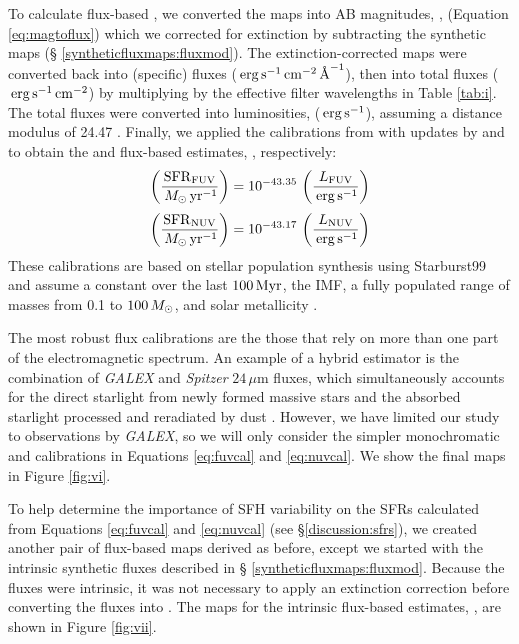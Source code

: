 \documentclass[iop, tighten]{emulateapj}
\begin{document}
To calculate flux-based , we converted the \fxobs{} maps into AB
magnitudes, \xobs{}, (Equation \ref{eq:magtoflux}) which we corrected for
extinction by subtracting the synthetic \ax{} maps (\S
\ref{syntheticfluxmaps:fluxmod}). The extinction-corrected maps were converted
back into (specific) fluxes ($\!\, \,\mathrm{erg}\,\mathrm{s}^{-1}\,\mathrm{cm}^{-2}\,\textrm{\AA}^{-1}$), then into total fluxes ($\,\mathrm{erg}
\,\mathrm{s}^{-1} \,\mathrm{cm}^{-2}$) by multiplying by the effective filter wavelengths in
Table \ref{tab:i}. The total fluxes were converted into luminosities, \lx{}
($\,\mathrm{erg} \,\mathrm{s}^{-1}$), assuming a distance modulus of 24.47
\citep{McConnachie:2005}. Finally, we applied the calibrations from
\citet{Kennicutt:1998} with updates by \citet{Hao:2011} and \citet{Murphy:2011}
\citep[see the review by][]{Kennicutt:2012} to obtain the \fuv{} and \nuv{}
flux-based \sfr{} estimates, \sfrx{}, respectively:
%
\begin{equation} \left(\frac{\sfrfuv}{\msun\yr^{-1}}\right) =
10^{-43.35}\,\left(\frac{\lfuv}{\erg\ssec^{-1}}\right) \label{eq:fuvcal}
\end{equation}
%
\begin{equation} \left(\frac{\sfrnuv}{\msun\yr^{-1}}\right) =
10^{-43.17}\,\left(\frac{\lnuv}{\erg\ssec^{-1}}\right) \label{eq:nuvcal}
\end{equation}
%
These calibrations are based on stellar population synthesis using Starburst99
\citep{Leitherer:1999} and assume a constant \sfr{} over the last $100\,\mathrm{Myr}$, the
\citet{Kroupa:2001} IMF, a fully populated range of masses from 0.1 to
$100\,M_\odot$, and solar metallicity \citep{Hao:2011}.

The most robust flux calibrations are the those that rely on more than one part
of the electromagnetic spectrum. An example of a hybrid estimator is the
combination of \emph{GALEX} \fuv{} and \emph{Spitzer} $24\,\mu\mathrm{m}$
fluxes, which simultaneously accounts for the direct starlight from newly formed
massive stars and the absorbed starlight processed and reradiated by dust
\citep[e.g.,][]{Leroy:2012}. However, we have limited our study to observations
by \emph{GALEX}, so we will only consider the simpler monochromatic \fuv{} and
\nuv{} calibrations in Equations \ref{eq:fuvcal} and \ref{eq:nuvcal}. We show
the final \sfrx{} maps in Figure \ref{fig:vi}.

To help determine the importance of SFH variability on the SFRs calculated from
Equations \ref{eq:fuvcal} and \ref{eq:nuvcal} (see \S \ref{discussion:sfrs}), we
created another pair of flux-based \sfr{} maps derived as before, except we
started with the intrinsic synthetic fluxes \fxsfhz{} described in \S
\ref{syntheticfluxmaps:fluxmod}. Because the fluxes were intrinsic, it was not
necessary to apply an extinction correction before converting the fluxes into
. The maps for the intrinsic flux-based \sfr{} estimates, \sfrxz{}, are
shown in Figure \ref{fig:vii}.
\end{document}
